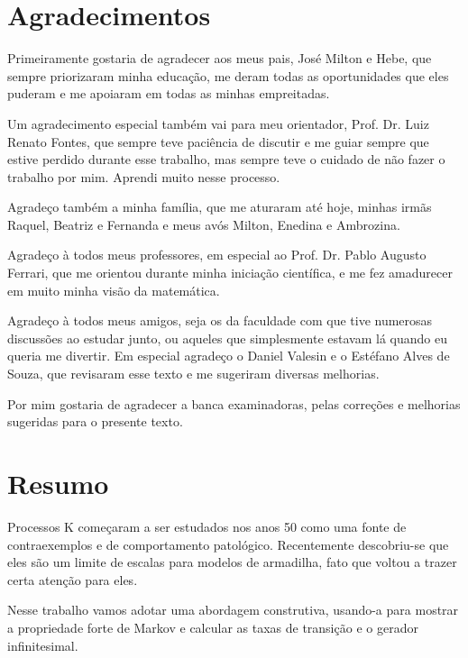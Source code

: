 \chapter*{Agradecimentos}

Primeiramente gostaria de agradecer aos meus pais, José Milton e Hebe,
que sempre priorizaram minha educação, me deram todas as oportunidades
que eles puderam e me apoiaram em todas as minhas empreitadas.

Um agradecimento especial também vai para meu orientador,
Prof. Dr. Luiz Renato Fontes, que sempre teve paciência de discutir e
me guiar sempre que estive perdido durante esse trabalho, mas sempre
teve o cuidado de não fazer o trabalho por mim. Aprendi muito nesse
processo.

Agradeço também a minha família, que me aturaram até hoje, minhas
irmãs Raquel, Beatriz e Fernanda e meus avós Milton, Enedina e
Ambrozina. %

Agradeço à todos meus professores, em especial ao Prof. Dr. Pablo
Augusto Ferrari, que me orientou durante minha iniciação científica, e
me fez amadurecer em muito minha visão da matemática.

Agradeço à todos meus amigos, seja os da faculdade com que tive
numerosas discussões ao estudar junto, ou aqueles que simplesmente
estavam lá quando eu queria me divertir. Em especial agradeço o Daniel
Valesin e o Estéfano Alves de Souza, que revisaram esse texto e me
sugeriram diversas melhorias.

Por mim gostaria de agradecer a banca examinadoras, pelas correções e
melhorias sugeridas para o presente texto.

\chapter*{Resumo}

Processos K começaram a ser estudados nos anos 50 como uma fonte de
contraexemplos e de comportamento patológico. Recentemente
descobriu-se que eles são um limite de escalas para modelos de
armadilha, fato que voltou a trazer certa atenção para eles.

Nesse trabalho vamos adotar uma abordagem construtiva, usando-a para
mostrar a propriedade forte de Markov e calcular as taxas de transição
e o gerador infinitesimal.

